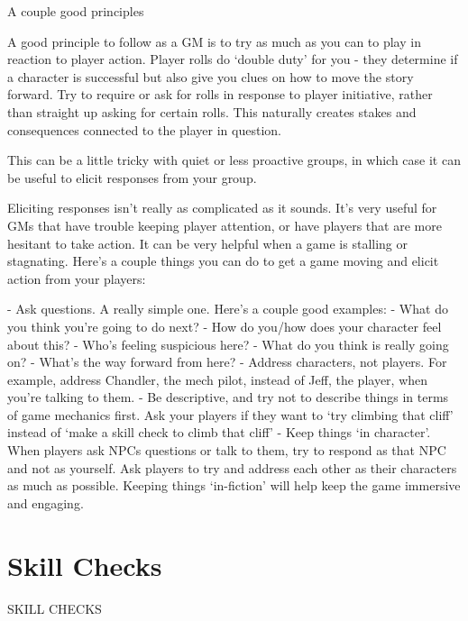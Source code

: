                                        A couple good principles

A good principle to follow as a GM is to try as much as you can to play in reaction to player
action. Player rolls do ‘double duty’ for you - they determine if a character is successful but also
give you clues on how to move the story forward. Try to require or ask for rolls in response to
player initiative, rather than straight up asking for certain rolls. This naturally creates stakes and
consequences connected to the player in question.


This can be a little tricky with quiet or less proactive groups, in which case it can be useful to
elicit responses from your group.


Eliciting responses isn’t really as complicated as it sounds. It’s very useful for GMs that have
trouble keeping player attention, or have players that are more hesitant to take action. It can be
very helpful when a game is stalling or stagnating. Here’s a couple things you can do to get a
game moving and elicit action from your players:

            -   Ask questions. A really simple one. Here’s a couple good examples:
                     -   What do you think you’re going to do next?
                     -   How do you/how does your character feel about this?
                     -   Who’s feeling suspicious here?
                     -   What do you think is really going on?
                     -   What’s the way forward from here?
            -   Address characters, not players. For example, address Chandler, the mech
                 pilot, instead of Jeff, the player, when you’re talking to them.
            -    Be descriptive, and try not to describe things in terms of game mechanics first.
                Ask your players if they want to ‘try climbing that cliff’ instead of ‘make a skill
                check to climb that cliff’
            -    Keep things ‘in character’. When players ask NPCs questions or talk to them, try
                to respond as that NPC and not as yourself. Ask players to try and address each
                other as their characters as much as possible. Keeping things ‘in-fiction’ will help
                 keep the game immersive and engaging.


\chapter{Skill Checks}

                                           SKILL CHECKS

